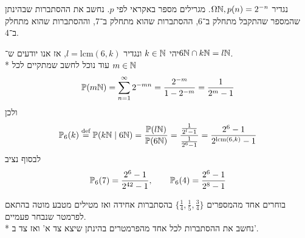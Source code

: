 \Subquestion{}
נגדיר $\Omega \mathbb{N}, p(n) = 2^{-n}$.
מגרילים מספר באקראי לפי $p$.
נחשב את ההסתברות שבהינתן שהמספר שהתקבל מתחלק ב־6, ההסתברות שהוא מתחלק ב־7, וההסתברות שהוא מתחלק ב־4.
\begin{solution}
	יהי $k \in \mathbb{N}$ ונגדיר $l = \text{lcm}(6, k)$, אז אנו יודעים ש־$6 \mathbb{N} \cap k \mathbb{N} = l \mathbb{N}$. \\*
	עוד נוכל לחשב שמתקיים לכל $m \in \mathbb{N}$
	\[
		\mathbb{P}(m\mathbb{N})
		= \sum_{n = 1}^{\infty} 2^{-mn}
		= \frac{2^{-m}}{1 - 2^{-m}}
		= \frac{1}{2^m - 1}
	\]
	ולכן
	\[
		\mathbb{P}_6(k) \overset{\text{def}}{=} \mathbb{P}(k \mathbb{N} \mid 6 \mathbb{N})
		= \frac{\mathbb{P}(l \mathbb{N})}{\mathbb{P}(6\mathbb{N})}
		= \frac{\frac{1}{2^l - 1}}{\frac{1}{2^6 - 1}}
		= \frac{2^6 - 1}{2^{\text{lcm}(6, k)} - 1}
	\]
	לבסוף נציב
	\[
		\mathbb{P}_6(7) = \frac{2^6 - 1}{2^{42} - 1},
		\qquad
		\mathbb{P}_6(4) = \frac{2^6 - 1}{2^8 - 1}
	\]
\end{solution}

\Subquestion{}
בוחרים אחד מהמספרים $\{ \frac{1}{4}, \frac{1}{5}, \frac{3}{4} \}$ בהסתברות אחידה ואז מטילים מטבע מוטה בהתאם לפרמטר שנבחר פעמיים. \\*
נחשב את ההסתברות לכל אחד מהפרמטרים בהינתן שיצא צד א' ואז צד ב'.
\begin{solution}
	
\end{solution}


